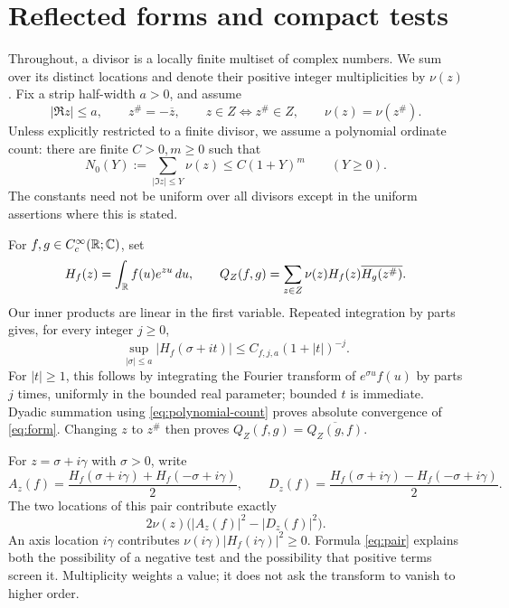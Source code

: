 \section{Reflected forms and compact tests}
\label{sec:basics}

Throughout, a divisor is a locally finite multiset of complex numbers.
We sum over its distinct locations and denote their positive integer
multiplicities by \(\nu(z)\). Fix a strip half-width \(a>0\), and
assume
\begin{equation}\label{eq:divisor}
 |\Re z|\le a,\qquad z^\#=-\overline z,\qquad
 z\in Z\Longleftrightarrow z^\#\in Z,\qquad
 \nu(z)=\nu(z^\#).
\end{equation}
Unless explicitly restricted to a finite divisor, we assume a polynomial
ordinate count: there are finite \(C>0,m\ge0\) such that
\begin{equation}\label{eq:polynomial-count}
 N_0(Y):=\sum_{|\Im z|\le Y}\nu(z)\le C(1+Y)^m
 \qquad(Y\ge0).
\end{equation}
The constants need not be uniform over all divisors except in the
uniform assertions where this is stated.

For \(f,g\in C_c^\infty(\mathbb R;\mathbb C)\), set
\begin{equation}\label{eq:form}
 H_f(z)=\int_\mathbb R f(u)e^{zu}\,du,\qquad
 Q_Z(f,g)=\sum_{z\in Z}\nu(z)H_f(z)\overline{H_g(z^\#)}.
\end{equation}
Our inner products are linear in the first variable. Repeated
integration by parts gives, for every integer \(j\ge0\),
\[
 \sup_{|\sigma|\le a}|H_f(\sigma+it)|
 \le C_{f,j,a}(1+|t|)^{-j}.
\]
For \(|t|\ge1\), this follows by integrating the Fourier transform
of \(e^{\sigma u}f(u)\) by parts \(j\) times, uniformly in the
bounded real parameter; bounded \(t\) is immediate. Dyadic summation
using \eqref{eq:polynomial-count} proves absolute convergence of
\eqref{eq:form}. Changing \(z\) to \(z^\#\) then proves
\(Q_Z(f,g)=\overline{Q_Z(g,f)}\).

For \(z=\sigma+i\gamma\) with \(\sigma>0\), write
\[
 A_z(f)=\frac{H_f(\sigma+i\gamma)+H_f(-\sigma+i\gamma)}2,
 \qquad
 D_z(f)=\frac{H_f(\sigma+i\gamma)-H_f(-\sigma+i\gamma)}2.
\]
The two locations of this pair contribute exactly
\begin{equation}\label{eq:pair}
 2\nu(z)\bigl(|A_z(f)|^2-|D_z(f)|^2\bigr).
\end{equation}
An axis location \(i\gamma\) contributes
\(\nu(i\gamma)|H_f(i\gamma)|^2\ge0\). Formula
\eqref{eq:pair} explains both the possibility of a negative test
and the possibility that positive terms screen it. Multiplicity
weights a value; it does not ask the transform to vanish to higher
order.

